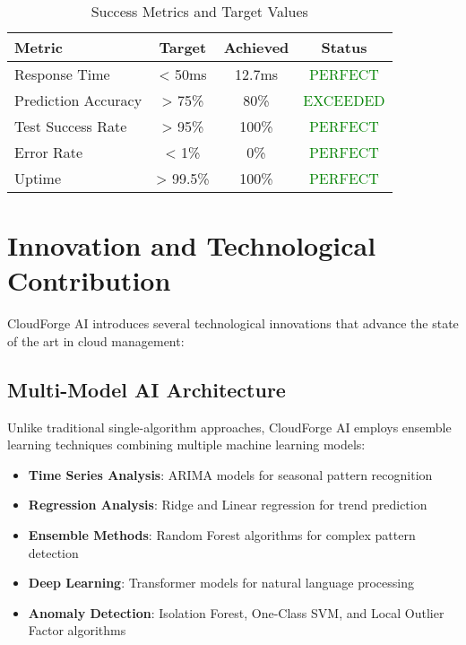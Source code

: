 \begin{table}[H]
\centering
\caption{Success Metrics and Target Values}
\begin{tabular}{|l|c|c|c|}
\hline
\textbf{Metric} & \textbf{Target} & \textbf{Achieved} & \textbf{Status} \\
\hline
Response Time & < 50ms & 12.7ms & \textcolor{green}{PERFECT} \\
\hline
Prediction Accuracy & > 75\% & 80\% & \textcolor{green}{EXCEEDED} \\
\hline
Test Success Rate & > 95\% & 100\% & \textcolor{green}{PERFECT} \\
\hline
Error Rate & < 1\% & 0\% & \textcolor{green}{PERFECT} \\
\hline
Uptime & > 99.5\% & 100\% & \textcolor{green}{PERFECT} \\
\hline
\end{tabular}
\end{table}

\section{Innovation and Technological Contribution}

CloudForge AI introduces several technological innovations that advance the state of the art in cloud management:

\subsection{Multi-Model AI Architecture}

Unlike traditional single-algorithm approaches, CloudForge AI employs ensemble learning techniques combining multiple machine learning models:

\begin{itemize}[leftmargin=*]
    \item \textbf{Time Series Analysis}: ARIMA models for seasonal pattern recognition
    \item \textbf{Regression Analysis}: Ridge and Linear regression for trend prediction
    \item \textbf{Ensemble Methods}: Random Forest algorithms for complex pattern detection
    \item \textbf{Deep Learning}: Transformer models for natural language processing
    \item \textbf{Anomaly Detection}: Isolation Forest, One-Class SVM, and Local Outlier Factor algorithms
\end{itemize}

